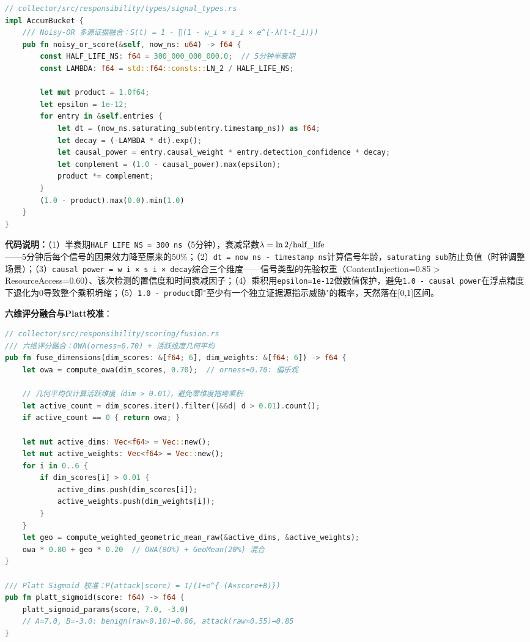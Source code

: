 \documentclass[a4paper]{ctexart}
\makeatletter
\renewcommand{\_}{%
  \ifmmode
    \nfss@text{\textunderscore}%
  \else
    \textunderscore\discretionary{}{}{}%
  \fi}
\makeatother
\begin{document}
\begin{lstlisting}[language=Rust]
// collector/src/responsibility/types/signal_types.rs
impl AccumBucket {
    /// Noisy-OR 多源证据融合：S(t) = 1 - ∏(1 - w_i × s_i × e^{-λ(t-t_i)})
    pub fn noisy_or_score(&self, now_ns: u64) -> f64 {
        const HALF_LIFE_NS: f64 = 300_000_000_000.0;  // 5分钟半衰期
        const LAMBDA: f64 = std::f64::consts::LN_2 / HALF_LIFE_NS;

        let mut product = 1.0f64;
        let epsilon = 1e-12;
        for entry in &self.entries {
            let dt = (now_ns.saturating_sub(entry.timestamp_ns)) as f64;
            let decay = (-LAMBDA * dt).exp();
            let causal_power = entry.causal_weight * entry.detection_confidence * decay;
            let complement = (1.0 - causal_power).max(epsilon);
            product *= complement;
        }
        (1.0 - product).max(0.0).min(1.0)
    }
}
\end{lstlisting}


\textbf{代码说明：}（1）半衰期\texttt{HALF\_LIFE\_NS = 300\_000\_000\_000 ns}（5分钟），衰减常数$\lambda = \ln 2 / \text{half\_life}$——5分钟后每个信号的因果效力降至原来的50\%；（2）\texttt{dt = now\_ns - timestamp\_ns}计算信号年龄，\texttt{saturating\_sub}防止负值（时钟调整场景）；（3）\texttt{causal\_power = w\_i × s\_i × decay}综合三个维度——信号类型的先验权重（ContentInjection=0.85 > ResourceAccess=0.60）、该次检测的置信度和时间衰减因子；（4）乘积用\texttt{epsilon=1e-12}做数值保护，避免\texttt{1.0 - causal\_power}在浮点精度下退化为0导致整个乘积坍缩；（5）\texttt{1.0 - product}即"至少有一个独立证据源指示威胁"的概率，天然落在[0,1]区间。


\textbf{六维评分融合与Platt校准}：


\begin{lstlisting}[language=Rust]
// collector/src/responsibility/scoring/fusion.rs
/// 六维评分融合：OWA(orness=0.70) + 活跃维度几何平均
pub fn fuse_dimensions(dim_scores: &[f64; 6], dim_weights: &[f64; 6]) -> f64 {
    let owa = compute_owa(dim_scores, 0.70);  // orness=0.70: 偏乐观

    // 几何平均仅计算活跃维度（dim > 0.01），避免零维度拖垮乘积
    let active_count = dim_scores.iter().filter(|&&d| d > 0.01).count();
    if active_count == 0 { return owa; }

    let mut active_dims: Vec<f64> = Vec::new();
    let mut active_weights: Vec<f64> = Vec::new();
    for i in 0..6 {
        if dim_scores[i] > 0.01 {
            active_dims.push(dim_scores[i]);
            active_weights.push(dim_weights[i]);
        }
    }
    let geo = compute_weighted_geometric_mean_raw(&active_dims, &active_weights);
    owa * 0.80 + geo * 0.20  // OWA(80%) + GeoMean(20%) 混合
}

/// Platt Sigmoid 校准：P(attack|score) = 1/(1+e^{-(A×score+B)})
pub fn platt_sigmoid(score: f64) -> f64 {
    platt_sigmoid_params(score, 7.0, -3.0)
    // A=7.0, B=-3.0: benign(raw≈0.10)→0.06, attack(raw≈0.55)→0.85
}
\end{lstlisting}
\end{document}

